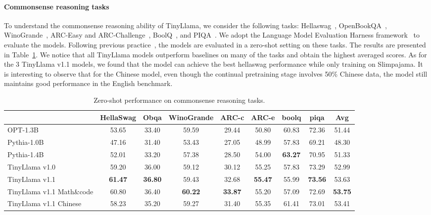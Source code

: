 \documentclass{article}
\begin{document}
\paragraph{Commonsense reasoning tasks} To understand the commonsense reasoning ability of TinyLlama,
we consider the following tasks: Hellaswag~\citep{zellers2019hellaswag},
OpenBookQA~\citep{mihaylov2018obqa},
WinoGrande~\citep{sakaguchi2021winogrande},
ARC-Easy and ARC-Challenge~\citep{clark2018arc},
BoolQ~\citep{clark2019boolq},
and PIQA~\citep{bisk2020piqa}.
We adopt the Language Model Evaluation Harness framework~\citep{evalharness} to evaluate the models.
Following previous practice~\citep{biderman2023pythia}, the models are evaluated in a zero-shot setting on these tasks.
The results are presented in Table~\ref{tab:pretrained_res}.
We notice that all TinyLlama models outperform baselines on many of the tasks and obtain the highest averaged scores.
As for the 3 TinyLlama v1.1 models, we found that the model can achieve the best hellaswag performance while only training on Slimpajama.
It is interesting to observe that for the Chinese model, even though the continual pretraining stage involves 50\% Chinese data, the model still maintains good performance in the English benchmark.
\begin{table}[htbp]
  \centering
  \scriptsize
  \caption{
    Zero-shot performance on commonsense reasoning tasks.
  }
  \begin{tabular}{lcccccccc}
    \toprule
    & \textbf{HellaSwag}	& \textbf{Obqa} &	\textbf{WinoGrande}	& \textbf{ARC-c}	& \textbf{ARC-e}	& \textbf{boolq}	& \textbf{piqa} & \textbf{Avg} \\
    \midrule
    OPT-1.3B\xspace      &  53.65	&33.40	& 59.59&	29.44	&50.80	&60.83	&72.36	& 51.44\\
    Pythia-1.0B\xspace      &  47.16	&31.40	&53.43&	27.05	&48.99	&57.83	&69.21	&48.30\\
    Pythia-1.4B\xspace      &  52.01	&33.20	&57.38&	28.50	& 54.00	&\textbf{63.27}	&70.95	&51.33\\
    \midrule
    TinyLlama v1.0\xspace      &  59.20	 & 36.00&	59.12&	30.12 & 55.25&	57.83	& 73.29	& 52.99  \\
    TinyLlama v1.1\xspace      &  \textbf{61.47}	&\textbf{36.80}&	59.43&	32.68&\textbf{55.47}&	55.99	&\textbf{73.56}	& 53.63  \\
    TinyLlama v1.1 Math\&code\xspace    &  60.80 &  36.40 &  \textbf{60.22} &  \textbf{33.87} & 55.20 & 57.09 & 72.69 &  \textbf{53.75} \\
    TinyLlama v1.1 Chinese\xspace     &  58.23 &  35.20 &  59.27 &  31.40 & 55.35 & 61.41 & 73.01 &  53.41 \\
    \bottomrule
  \end{tabular}
  \label{tab:pretrained_res}
  \vspace{-0.5em}
\end{table}
\vspace{-0.5em}
\end{document}
